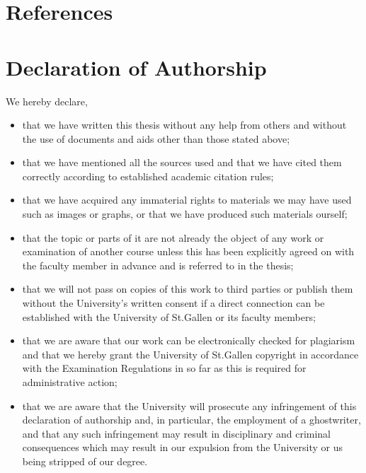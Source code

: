 \documentclass[a4paper,american,12pt]{article}
\begin{document}
\section{References}
\printbibliography[heading=none]

\clearpage

\section{Declaration of Authorship}
We hereby declare,
\begin{itemize}
\item that we have written this thesis without any help from others and without the use of documents and aids other than those stated above;
\item that we have mentioned all the sources used and that we have cited them correctly according to established academic citation rules;
\item that we have acquired any immaterial rights to materials we may have used such as images or graphs, or that we have produced such materials ourself;
\item that the topic or parts of it are not already the object of any work or examination of another course unless this has been explicitly agreed on with the faculty member in advance and is referred to in the thesis;
\item that we will not pass on copies of this work to third parties or publish them without the University’s written consent if a direct connection can be established with the University of St.Gallen or its faculty members;
\item that we are aware that our work can be electronically checked for plagiarism and that we hereby grant the University of St.Gallen copyright in accordance with the Examination Regulations in so far as this is required for administrative action;
\item that we are aware that the University will prosecute any infringement of this declaration of authorship and, in particular, the employment of a ghostwriter, and that any such infringement may result in disciplinary and criminal consequences which may result in our expulsion from the University or us being stripped of our degree.
\end{itemize}
\end{document}
